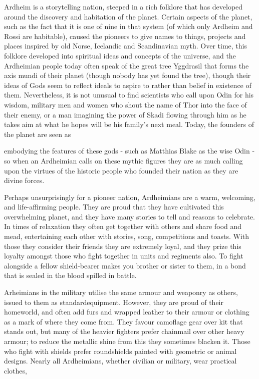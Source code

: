 \documentclass{scrbook}
\begin{document}
Ardheim is a storytelling nation, steeped in a rich folklore that has developed around the discovery and habitation of the planet. Certain aspects of the planet, such as the fact that it is one of nine in that system (of which only Ardheim and Rossi are habitable), caused the pioneers to give names to things, projects and places inspired by old Norse, Icelandic and Scandinavian myth. Over time, this folklore developed into spiritual ideas and concepts of the universe, and the Ardheimian people today often speak of the great tree Yggdrasil that forms the axis mundi of their planet (though nobody has yet found the tree), though their ideas of Gods seem to reflect ideals to aspire to rather than belief in existence of them. Nevertheless, it is not unusual to find scientists who call upon Odin for his wisdom, military men and women who shout the name of Thor into the face of their enemy, or a man imagining the power of Skadi flowing through him as he takes aim at what he hopes will be his family's next meal. Today, the founders of the planet are seen as

embodying the features of these gods - such as Matthias Blake as the wise Odin - so when an Ardheimian calls on these mythic figures they are as much calling upon the virtues of the historic people who founded their nation as they are divine forces.

Perhaps unsurprisingly for a pioneer nation, Ardheimians are a warm, welcoming, and life-affirming people. They are proud that they have cultivated this overwhelming planet, and they have many stories to tell and reasons to celebrate. In times of relaxation they often get together with others and share food and mead, entertaining each other with stories, song, competitions and toasts. With those they consider their friends they are extremely loyal, and they prize this loyalty amongst those who fight together in units and regiments also. To fight alongside a fellow shield-bearer makes you brother or sister to them, in a bond that is sealed in the blood spilled in battle.

Arheimians in the military utilise the same armour and weaponry as others, issued to them as standardequipment. However, they are proud of their homeworld, and often add furs and wrapped leather to their armour or clothing as a mark of where they come from. They favour camoflage gear over kit that stands out, but many of the heavier fighters prefer chainmail over other heavy armour; to reduce the metallic shine from this they sometimes blacken it. Those who fight with shields prefer roundshields painted with geometric or animal designs. Nearly all Ardheimians, whether civilian or military, wear practical clothes,
\end{document}
